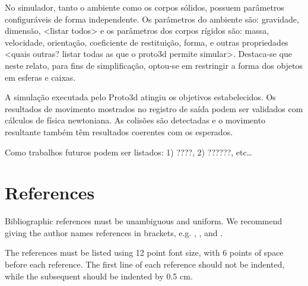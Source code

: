 \documentclass[12pt]{article}
\begin{document}
No simulador, tanto o ambiente como os corpos sólidos, possuem parâmetros configuráveis de forma independente. Os parâmetros do ambiente são:  gravidade, dimensão, <listar todos>  e os parâmetros dos corpos rígidos são: massa, velocidade, orientação, coeficiente de restituição, forma, e outras propriedades <quais outras? listar todas as que o proto3d permite simular>. Destaca-se que neste relato, para fins de simplificação, optou-se em restringir a forma dos objetos em esferas e caixas.

A simulação executada pelo Proto3d atingiu os objetivos estabelecidos. Os resultados de movimento mostrados no registro de saída podem ser validados com cálculos de física newtoniana. As colisões são detectadas e o movimento resultante também têm resultados coerentes com os esperados. 

Como trabalhos futuros podem ser listados: 1) ????, 2) ??????, etc…



\section{References}

Bibliographic references must be unambiguous and uniform.  We recommend giving
the author names references in brackets, e.g. \cite{knuth:84},
\cite{boulic:91}, and \cite{smith:99}.

The references must be listed using 12 point font size, with 6 points of space
before each reference. The first line of each reference should not be
indented, while the subsequent should be indented by 0.5 cm.



\end{document}
